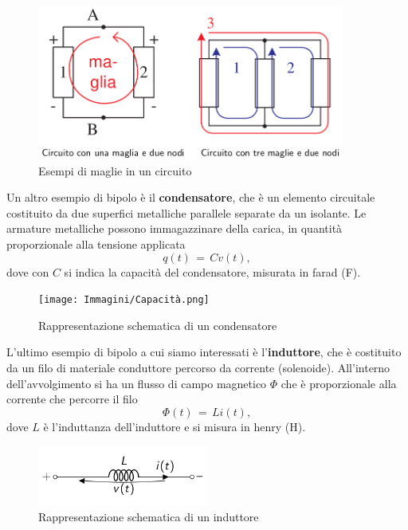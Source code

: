 \begin{figure}[H]
    \centering
    \includegraphics[width=0.9\textwidth]{Immagini/EsempioMaglie.png}
    \caption{Esempi di maglie in un circuito}
    \label{figure: KirchoffLaws}
\end{figure}
Un altro esempio di bipolo è il \textbf{condensatore}, che è un elemento circuitale costituito da due superfici metalliche 
parallele separate da un isolante. Le armature metalliche possono immagazzinare della carica, in quantità proporzionale alla
tensione applicata
\begin{equation}
    q(t)\,=\,Cv(t),
    \label{equation: capacità}
\end{equation}
dove con $C$ si indica la capacità del condensatore, misurata in farad (F).
\begin{figure}[H]
    \centering
    \texttt{[image: Immagini/Capacità.png]}
    \caption{Rappresentazione schematica di un condensatore}
    \label{figure: resistenza}
\end{figure}
L'ultimo esempio di bipolo a cui siamo interessati è l'\textbf{induttore}, che è costituito da un filo di materiale
conduttore percorso da corrente (solenoide).
All'interno dell'avvolgimento si ha un flusso di campo magnetico $\Phi$ che è proporzionale alla corrente che percorre il
filo
\begin{equation}
    \Phi(t)\,=\,Li(t),
    \label{equation: induttanza}
\end{equation}
dove $L$ è l'induttanza dell'induttore e si misura in henry (H).
\begin{figure}[H]
    \centering
    \includegraphics[width=0.5\textwidth]{Immagini/Induttanza.png}
    \caption{Rappresentazione schematica di un induttore}
    \label{figure: induttanza}
\end{figure}


